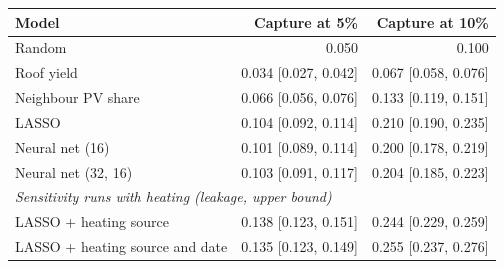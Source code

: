 \begin{tabular}{p{3.4cm}rr}
\toprule
Model & Capture at 5\% & Capture at 10\% \\
\midrule
Random & 0.050 & 0.100 \\
Roof yield & 0.034 [0.027, 0.042] & 0.067 [0.058, 0.076] \\
Neighbour PV share & 0.066 [0.056, 0.076] & 0.133 [0.119, 0.151] \\
LASSO & 0.104 [0.092, 0.114] & 0.210 [0.190, 0.235] \\
Neural net (16) & 0.101 [0.089, 0.114] & 0.200 [0.178, 0.219] \\
Neural net (32, 16) & 0.103 [0.091, 0.117] & 0.204 [0.185, 0.223] \\
\midrule
\multicolumn{3}{l}{\textit{Sensitivity runs with heating (leakage, upper bound)}} \\
LASSO + heating source & 0.138 [0.123, 0.151] & 0.244 [0.229, 0.259] \\
LASSO + heating source and date & 0.135 [0.123, 0.149] & 0.255 [0.237, 0.276] \\
\bottomrule
\end{tabular}
